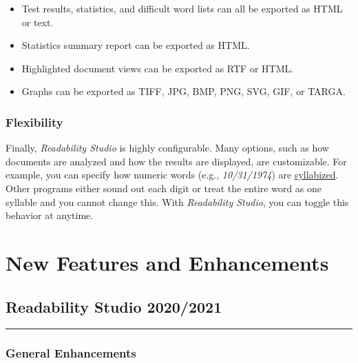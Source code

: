 \documentclass[
]{book}
\providecommand{\tightlist}{%
  \setlength{\itemsep}{0pt}\setlength{\parskip}{0pt}}
\theoremstyle{definition}
\theoremstyle{definition}
\theoremstyle{definition}
\theoremstyle{definition}
\theoremstyle{remark}
\begin{document}
\begin{itemize}
\tightlist
\item
  Test results, statistics, and difficult word lists can all be exported as HTML or text.
\item
  Statistics summary report can be exported as HTML.
\item
  Highlighted document views can be exported as RTF or HTML.
\item
  Graphs can be exported as TIFF, JPG, BMP, PNG, SVG, GIF, or TARGA.
\end{itemize}

\hypertarget{flexibility}{%
\subsubsection*{Flexibility}\label{flexibility}}

Finally, \emph{Readability Studio} is highly configurable. Many options, such as how documents are analyzed and how the results are displayed, are customizable. For example, you can specify how numeric words (e.g., \emph{10/31/1974}) are \protect\hyperlink{document-analysis}{syllabized}. Other programs either sound out each digit or treat the entire word as one syllable and you cannot change this. With \emph{Readability Studio}, you can toggle this behavior at anytime.

\hypertarget{new-features}{%
\section{New Features and Enhancements}\label{new-features}}

\hypertarget{readability-studio-20202021}{%
\subsection*{Readability Studio 2020/2021}\label{readability-studio-20202021}}

\begin{center}\rule{0.5\linewidth}{0.5pt}\end{center}

\hypertarget{general-enhancements}{%
\subsubsection*{General Enhancements}\label{general-enhancements}}
\end{document}

